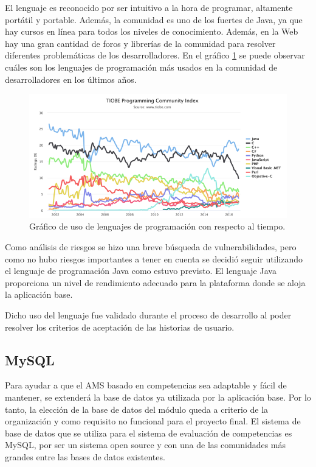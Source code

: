 El lenguaje es reconocido por ser intuitivo a la hora de programar, altamente portátil y portable. Además, la comunidad es uno de los fuertes de Java, ya que hay cursos en línea para todos los niveles de conocimiento. Además, en la Web hay una gran cantidad de foros y librerías de la comunidad para resolver diferentes problemáticas de los desarrolladores. En el gráfico \ref{graph_java} se puede observar cuáles son los lenguajes de programación más usados en la comunidad de desarrolladores en los últimos años.

\begin{figure}[H]
\centering
\includegraphics[width=125mm,scale=1]{Figuras/tecnologias/java}
\caption{Gráfico de uso de lenguajes de programación con respecto al tiempo.}
  \label{graph_java}
\end{figure}

Como análisis de riesgos se hizo una breve búsqueda de vulnerabilidades, pero como no hubo riesgos importantes a tener en cuenta se decidió seguir utilizando el lenguaje de programación Java como estuvo previsto. El lenguaje Java proporciona un nivel de rendimiento adecuado para la plataforma donde se aloja la aplicación base.

Dicho uso del lenguaje fue validado durante el proceso de desarrollo al poder resolver los criterios de aceptación de las historias de usuario.

\subsection{MySQL}
Para ayudar a que el AMS basado en competencias sea adaptable y fácil de mantener, se extenderá la base de datos ya utilizada por la aplicación base. Por lo tanto, la elección de la base de datos del módulo queda a criterio de la organización y como requisito no funcional para el proyecto final. El sistema de base de datos que se utiliza para el sistema de evaluación de competencias es MySQL, por ser un sistema open source y con una de las comunidades más grandes entre las bases de datos existentes.

